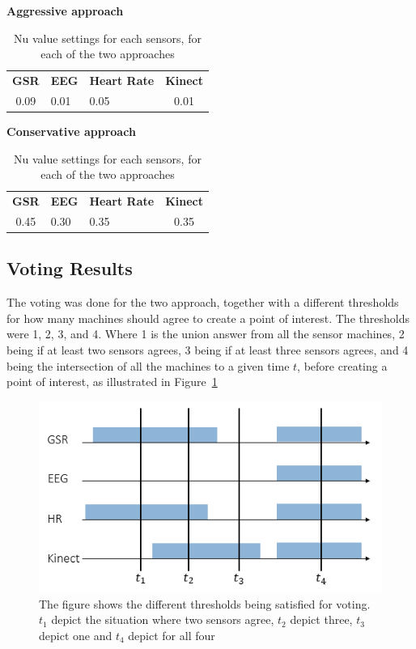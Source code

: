 \begin{table}[h]
  \centering
  \textbf{Aggressive approach}\vspace{2pt}
  \begin{tabularx}{\columnwidth}{cXXc}
    \toprule
    \textbf{GSR} & \textbf{EEG} & \textbf{Heart Rate} & \textbf{Kinect} \\
    0.09 & 0.01 & 0.05 & 0.01 \\
    \bottomrule
  \end{tabularx}

  \textbf{Conservative approach}\vspace{2pt}
  \begin{tabularx}{\columnwidth}{cXXc}
    \toprule
    \textbf{GSR} & \textbf{EEG} & \textbf{Heart Rate} & \textbf{Kinect} \\
    0.45 & 0.30 & 0.35 & 0.35 \\
    \bottomrule
  \end{tabularx}
  \caption{Nu value settings for each sensors, for each of the two approaches}
  \label{tab:nu_voting_settings}
\end{table}


\subsection{Voting Results}
The voting was done for the two approach, together with a different thresholds for how many machines should agree to create a point of interest.
The thresholds were 1, 2, 3, and 4. Where 1 is the union answer from all the sensor machines, 2 being if at least two sensors agrees, 3 being if at least three sensors agrees, and 4 being the intersection of all the machines to a given time $t$, before creating a point of interest, as illustrated in Figure~\ref{[FIGURE] voting} 
\begin{figure}
    \centering
  \includegraphics[width=0.75\columnwidth]{graphics/voting.png}
    \caption{The figure shows the different thresholds being satisfied for voting. $t_1$ depict the situation where two sensors agree, $t_2$ depict three, $t_3$ depict one and $t_4$ depict for all four}
    \label{[FIGURE] voting}
\end{figure}



